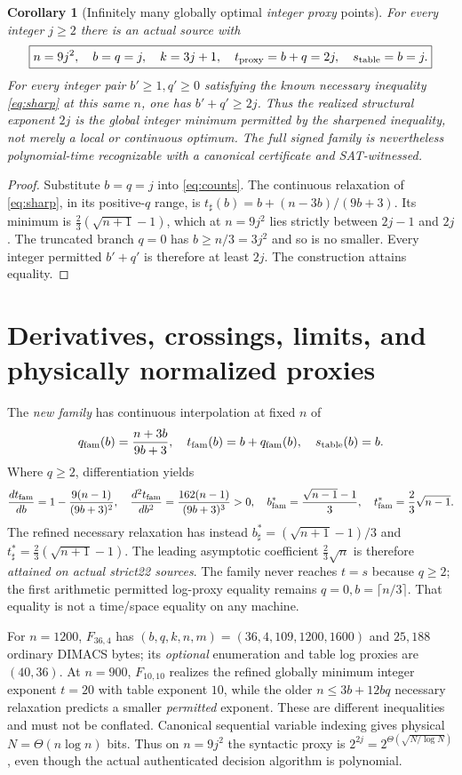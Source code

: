 \documentclass[10.5pt]{article}
\newtheorem{corollary}[theorem]{Corollary}
\begin{document}
\begin{corollary}[Infinitely many globally optimal \emph{integer proxy} points]\label{cor:optimal}
For every integer $j\ge2$ there is an actual source with
\[
 \boxed{n=9j^2,\quad b=q=j,\quad k=3j+1,\quad t_{\rm proxy}=b+q=2j,\quad s_{\rm table}=b=j.}
\]
For \emph{every} integer pair $b'\ge1,q'\ge0$ satisfying the known necessary inequality \eqref{eq:sharp} at this same $n$, one has $b'+q'\ge2j$. Thus the realized structural exponent $2j$ is the \emph{global integer minimum permitted by the sharpened inequality}, not merely a local or continuous optimum. The full signed family is nevertheless polynomial-time recognizable with a canonical certificate and SAT-witnessed.
\end{corollary}
\begin{proof}
Substitute $b=q=j$ into \eqref{eq:counts}. The continuous relaxation of \eqref{eq:sharp}, in its positive-$q$ range, is $t_\sharp(b)=b+(n-3b)/(9b+3)$. Its minimum is $\frac23(\sqrt{n+1}-1)$, which at $n=9j^2$ lies strictly between $2j-1$ and $2j$. The truncated branch $q=0$ has $b\ge n/3=3j^2$ and so is no smaller. Every integer permitted $b'+q'$ is therefore at least $2j$. The construction attains equality.
\end{proof}

\section{Derivatives, crossings, limits, and physically normalized proxies}
The \emph{new family} has continuous interpolation at fixed $n$ of
\[
 q_{\rm fam}(b)=\frac{n+3b}{9b+3},\quad
 t_{\rm fam}(b)=b+q_{\rm fam}(b),\quad s_{\rm table}(b)=b.
\]
Where $q\ge2$, differentiation yields
\begin{equation}\label{eq:derivatives}
 \frac{dt_{\rm fam}}{db}=1-\frac{9(n-1)}{(9b+3)^2},\quad
 \frac{d^2t_{\rm fam}}{db^2}=\frac{162(n-1)}{(9b+3)^3}>0,\quad
 b^*_{\rm fam}=\frac{\sqrt{n-1}-1}{3},\quad
 t^*_{\rm fam}=\frac23\sqrt{n-1}.
\end{equation}
The refined necessary relaxation has instead $b^*_{\sharp}=(\sqrt{n+1}-1)/3$ and $t^*_{\sharp}=\frac23(\sqrt{n+1}-1)$. The leading asymptotic coefficient $\frac23\sqrt n$ is therefore \emph{attained on actual strict22 sources}. The family never reaches $t=s$ because $q\ge2$; the first arithmetic permitted log-proxy equality remains $q=0,b=\lceil n/3\rceil$. That equality is not a time/space equality on any machine.

For $n=1200$, $F_{36,4}$ has $(b,q,k,n,m)=(36,4,109,1200,1600)$ and $25{,}188$ ordinary DIMACS bytes; its \emph{optional} enumeration and table log proxies are $(40,36)$. At $n=900$, $F_{10,10}$ realizes the refined globally minimum integer exponent $t=20$ with table exponent $10$, while the older $n\le3b+12bq$ necessary relaxation predicts a smaller \emph{permitted} exponent. These are different inequalities and must not be conflated. Canonical sequential variable indexing gives physical $N=\Theta(n\log n)$ bits. Thus on $n=9j^2$ the syntactic proxy is $2^{2j}=2^{\Theta(\sqrt{N/\log N})}$, even though the actual authenticated decision algorithm is polynomial.
\end{document}
